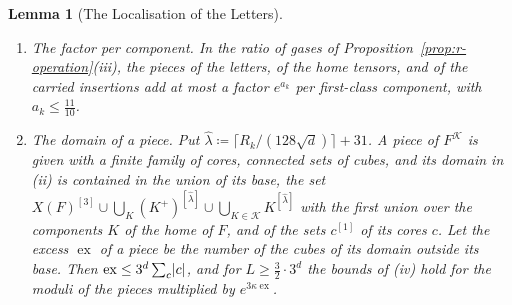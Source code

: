 \documentclass[11pt]{preprint}
\DeclarePairedDelimiter{\abs}{\lvert}{\rvert}
\numberwithin{equation}{section}
\newtheorem{lemma}{Lemma}[section]
\theoremstyle{definition}
\theoremstyle{remark}
\theoremstyle{plain}
\begin{document}
\begin{lemma}[The Localisation of the Letters]
\begin{enumerate}[label=(\roman*)]
\begin{equation}\label{eq:marked-unit}
    \sum_{\mathcal K \ni K_0}C_R^{\abs{\mathcal K}}e^{-\frac{63}{64}\ell_c(F,\mathcal K)} \leq 2(e^{x'_F} - 1)e^{-\rho(\hat T, K_0)/c_{\mathrm{dec}}}\;.
\end{equation}
\item \emph{The factor per component.} In the ratio of gases of Proposition~\ref{prop:r-operation}(iii), the pieces of the letters, of the home tensors, and of the carried insertions add at most a factor $e^{a_k}$ per first-class component, with $a_k \leq \frac{11}{10}$.
\item \emph{The domain of a piece.} Put $\hat\lambda \coloneqq \lceil R_k/(128\sqrt d)\rceil + 31$. A piece of $F^{\mathcal K}$ is given with a finite family of \emph{cores}, connected sets of cubes, and its domain in (ii) is contained in the union of its \emph{base}, the set $X(F)^{[3]} \cup \bigcup_K(K^+)^{[\hat\lambda]} \cup \bigcup_{K \in \mathcal K}K^{[\hat\lambda]}$ with the first union over the components $K$ of the home of $F$, and of the sets $c^{[1]}$ of its cores $c$. Let the \emph{excess} $\operatorname{ex}$ of a piece be the number of the cubes of its domain outside its base. Then $\operatorname{ex} \leq 3^d\sum_c\abs c$, and for $L \geq \frac32 \cdot 3^d$ the bounds of (iv) hold for the moduli of the pieces multiplied by $e^{3\kappa\operatorname{ex}}$.
\end{enumerate}
\end{lemma}
\end{document}
